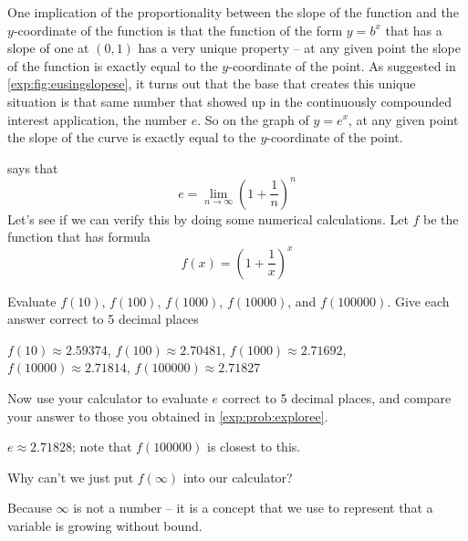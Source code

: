 One implication of the proportionality between the slope of the function 
and the $y$-coordinate of the function is that the function of the 
form $y=b^x$ that has a slope of one at $(0,1)$ has a very unique 
property -- at any given point the slope of the function is exactly 
equal to the $y$-coordinate of the point. As suggested in \cref{exp:fig:eusingslopese}, 
it turns out that the base that creates this unique situation is that 
same number that showed up in the continuously compounded interest 
application, the number $e$. So on the graph of $y=e^x$, at any given 
point the slope of the curve is exactly equal to the $y$-coordinate of 
the point.
			
\investigation*{}
\begin{problem}
 says that 
\[
	e = \lim_{n\rightarrow\infty}\left( 1+\frac{1}{n} \right)^n   
\]
Let's see if we can verify this by doing some numerical calculations. Let $f$ 
be the function that has formula
\[
	f(x) = \left( 1+\frac{1}{x} \right)^x   
\]
\begin{subproblem}\label{exp:prob:exploree}
	Evaluate $f(10)$, $f(100)$, $f(1000)$, $f(10000)$, and $f(100000)$. Give 
	each answer correct to 5 decimal places
	\begin{shortsolution}
		$f(10)\approx 2.59374$, $f(100)\approx 2.70481$, $f(1000)\approx 2.71692$, $f(10000)\approx 2.71814$, $f(100000)\approx 2.71827$ 
	\end{shortsolution}
\end{subproblem}
\begin{subproblem}
	Now use your calculator to evaluate $e$ correct to 5 decimal places, and compare your answer
	to those you obtained in \cref{exp:prob:exploree}.
	\begin{shortsolution}
		$e\approx 2.71828$; note that $f(100000)$ is closest to this.
	\end{shortsolution}
\end{subproblem}
\begin{subproblem}
	Why can't we just put $f(\infty)$ into our calculator? 
	\begin{shortsolution}
		Because $\infty$ is not a number -- it is a concept that we use to represent that a variable is growing 
		without bound.
	\end{shortsolution}
\end{subproblem}
\end{problem}
